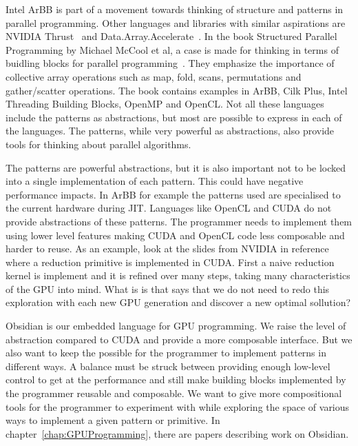 \documentclass[a4paper]{book}
\begin{document}
Intel ArBB is part of a movement towards thinking of structure and patterns in 
parallel programming. Other languages and libraries with similar aspirations 
are NVIDIA Thrust~\citet{THRUST} and Data.Array.Accelerate~\citet{ACCELERATEDAMP11}.
In the book Structured Parallel Programming by Michael McCool et al, a case is 
made for thinking in terms of buidling blocks for parallel programming~\citet{STRUCTURED}. 
They emphasize the importance of collective array operations such as map, fold, scans, 
permutations and gather/scatter operations. The book contains examples in ArBB, Cilk Plus, 
Intel Threading Building Blocks, OpenMP and OpenCL. Not all these languages include 
the patterns as abstractions, but most are possible to express in each of the languages. 
The patterns, while very powerful as abstractions, also provide tools for thinking about 
parallel algorithms. 

The patterns are powerful abstractions, but it is also important not to be locked into 
a single implementation of each pattern. This could have negative performance impacts. 
In ArBB for example the patterns used are specialised to the current hardware during JIT. 
Languages like OpenCL and CUDA do not provide abstractions of these patterns. The programmer 
needs to implement them using lower level features making CUDA and OpenCL code less composable 
and harder to reuse. As an example, look at the slides from NVIDIA in reference~\citet{reduction} 
where a reduction primitive is implemented in CUDA. First a naive reduction kernel is implement 
and it is refined over many steps, taking many characteristics of the GPU into mind. What is 
is that says that we do not need to redo this exploration with each new GPU generation 
and discover a new optimal sollution?  

Obsidian is our embedded language for GPU programming. We raise the level of abstraction 
compared to CUDA and provide a more composable interface. But we also want to keep 
the possible for the programmer to implement patterns in different ways. A balance 
must be struck between providing enough low-level control to get at the performance 
and still make building blocks implemented by the programmer reusable and composable. 
We want to give more compositional tools for the programmer to experiment with while 
exploring the space of various ways to implement a given pattern or primitive. 
In chapter~\ref{chap:GPUProgramming}, there are papers describing work on Obsidian. 

\end{document}
